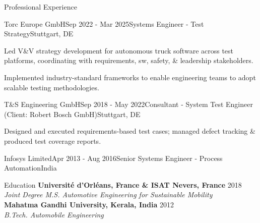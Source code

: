 \documentclass{resume} %
\begin{document}
\begin{rSection}{Professional Experience}
		\begin{rSubsection}{Torc Europe GmbH}{Sep 2022 - Mar 2025}{Systems Engineer - Test Strategy}{Stuttgart, DE}
			\fontsize{10pt}{12pt}\selectfont
			\item Led V\&V strategy development for autonomous truck software across test platforms, coordinating with requirements, sw, safety, \& leadership stakeholders.
			\item Implemented industry-standard  frameworks to enable engineering teams to adopt scalable testing methodologies.
		\end{rSubsection}

		\begin{rSubsection}{T\&S Engineering GmbH}{Sep 2018 - May 2022}{Consultant - System Test Engineer (Client: Robert Bosch GmbH)}{Stuttgart, DE}
			\fontsize{10pt}{12pt}\selectfont
			\item Designed and executed requirements-based test cases; managed defect tracking \& produced test coverage reports.
		\end{rSubsection}
		

\begin{rSubsection}{Infosys Limited}{Apr 2013 - Aug 2016}{Senior Systems Engineer - Process Automation}{India}
	\item[] \vspace{-\baselineskip}
\end{rSubsection}

	\end{rSection}


	\begin{rSection}{Education}
		{\bf Universit\'e d'Orl\'eans, France \& ISAT Nevers, France} \hfill {2018} \\ 
		{\small \emph{Joint Degree M.S. Automotive Engineering for Sustainable Mobility}} \\
		{\bf Mahatma Gandhi University, Kerala, India} \hfill {2012} \\ 
		{\small \emph{B.Tech. Automobile Engineering}}
	\end{rSection}
\end{document}
